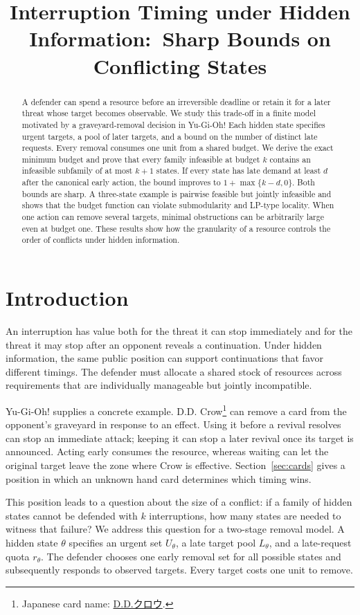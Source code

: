 \documentclass[11pt,a4paper]{amsart}
\date{}
\title[Resource bounds for hidden-state conflicts]{Interruption Timing under Hidden Information:\ Sharp Bounds on Conflicting States}
\newcommand{\jp}[1]{{\japanesefont #1}}
\theoremstyle{definition}
\theoremstyle{remark}
\newcommand{\cardnote}[2]{\footnote{Japanese card name: \href{https://www.db.yugioh-card.com/yugiohdb/card_search.action?ope=2\&cid=#1\&request_locale=ja}{\jp{#2}}.}}
\begin{document}
\begin{abstract}
A defender can spend a resource before an irreversible deadline or retain it
for a later threat whose target becomes observable. We study this trade-off
in a finite model motivated by a graveyard-removal decision in Yu-Gi-Oh!
Each hidden state specifies urgent targets, a pool of later targets, and a
bound on the number of distinct late requests. Every removal consumes one unit
from a shared budget. We derive the exact minimum budget and prove that every
family infeasible at budget $k$ contains an infeasible subfamily of at most
$k+1$ states. If every state has late demand at least $d$ after the canonical
early action, the bound improves to $1+\max\{k-d,0\}$. Both bounds are sharp.
A three-state example is pairwise feasible but jointly infeasible and shows
that the budget function can violate submodularity and LP-type locality.
When one action can remove several targets, minimal obstructions can be
arbitrarily large even at budget one. These results show how the granularity
of a resource controls the order of conflicts under hidden information.
\end{abstract}
\maketitle

\section{Introduction}

An interruption has value both for the threat it can stop immediately and
for the threat it may stop after an opponent reveals a continuation. Under
hidden information, the same public position can support continuations that
favor different timings. The defender must allocate a shared stock of resources
across requirements that are individually manageable but jointly incompatible.

Yu-Gi-Oh! supplies a concrete example. D.D. Crow\cardnote{6980}{D.D.クロウ}
can remove a card from the opponent's graveyard in response to an effect.
Using it before a revival resolves can stop an immediate attack; keeping it
can stop a later revival once its target is announced. Acting early consumes
the resource, whereas waiting can let the original target leave the zone
where Crow is effective. Section~\ref{sec:cards} gives a position in which an
unknown hand card determines which timing wins.

This position leads to a question about the size of a conflict:
if a family of hidden states cannot be defended with $k$ interruptions, how
many states are needed to witness that failure? We address this question
for a two-stage removal model. A hidden state $\theta$ specifies an urgent
set $U_\theta$, a late target pool $L_\theta$, and a late-request quota
$r_\theta$. The defender chooses one early removal set for all possible
states and subsequently responds to observed targets. Every target costs
one unit to remove.
\end{document}
